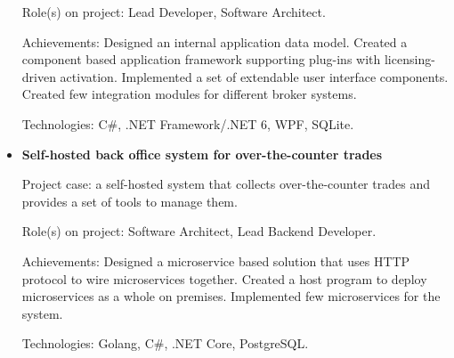 \documentclass{article}
\begin{document}
\begin{itemize}
{        Role(s) on project: Lead Developer, Software Architect.
        
        Achievements:
        Designed an internal application data model.
        Created a component based application framework supporting plug-ins with licensing-driven activation.
        Implemented a set of extendable user interface components.
        Created few integration modules for different broker systems.
        
        Technologies: C\#, .NET Framework/.NET 6, WPF, SQLite.
    }
    \item {
        \textbf{Self-hosted back office system for over-the-counter trades}
        
        Project case: a self-hosted system that collects over-the-counter trades and provides a set of tools to manage them.
        
        Role(s) on project: Software Architect, Lead Backend Developer.
        
        Achievements:
        Designed a microservice based solution that uses HTTP protocol to wire microservices together.
        Created a host program to deploy microservices as a whole on premises.
        Implemented few microservices for the system.
        
        Technologies: Golang, C\#, .NET Core, PostgreSQL.
    }
\end{itemize}
\end{document}

